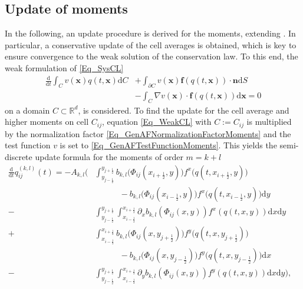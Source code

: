 \documentclass[12pt,a4paper]{article}
\begin{document}
\subsection{Update of moments}
\label{Chap_GenAF2DarbMoments}
In the following, an update procedure is derived for the moments, extending \cite{AB2023ExtensionAF, AB2023FEFV, ABK2025}. In particular, a conservative update of the cell averages is obtained, which is key to ensure convergence to the weak solution of the conservation law. 
To this end, the weak formulation of \eqref{Eq_SysCL} 
\begin{equation} \label{Eq_WeakCL}
\begin{aligned}
	\frac{\mathrm d}{\mathrm d t} \int_{C}  v(\mathbf x) q (t, \mathbf x) \mathrm{d}C &+ \int_{\partial C}v(\mathbf x) \mathbf f\left(q(t, \mathbf x)\right) \cdot \mathbf n \mathrm{d}S  \\
	&-\int_{C}  \nabla v(\mathbf x) \cdot\mathbf f\left(q(t, \mathbf x)\right) \mathrm{d} \mathbf x  = 0
\end{aligned}
\end{equation}
on a domain $C \subset \mathbb R^d$, is considered. 
To find the update for the cell average and higher moments on cell $C_{ij}$, equation \eqref{Eq_WeakCL} with $C:= C_{ij}$ is multiplied by the normalization factor \eqref{Eq_GenAFNormalizationFactorMoments} and the test function \(v\) is set to \eqref{Eq_GenAFTestFunctionMoments}.
This yields the semi-discrete update formula for the moments of order $m=k+l$
\begin{equation}\label{Eq_WeakCLCell}
\begin{aligned}
	\frac{\mathrm d}{\mathrm dt} q_{ij}^{(k,l)}(t) =- A_{k,l}
	\bigg(
	& \int_{y_{j-\frac{1}{2}}}^{y_{j+\frac{1}{2}}} b_{k,l}\big(\Phi_{ij}(x_{i+\frac{1}{2}}, y)\big) f^x\big(q(t, x_{i+\frac{1}{2}}, y)\big) \\
	& \hspace{3em}	- b_{k,l}\big(\Phi_{ij}(x_{i-\frac{1}{2}}, y)\big)f^x\big(q(t, x_{i-\frac{1}{2}}, y)\big) \mathrm d y \\
	-& \int_{y_{j-\frac{1}{2}}}^{y_{j+\frac{1}{2}}} \int_{x_{i-\frac{1}{2}}}^{x_{i+\frac{1}{2}}}  \partial_x b_{k,l}\left(\Phi_{ij}(x, y)\right) f^x\left(q(t, x,y)\right) \mathrm d x \mathrm d y \\
	+& \int_{x_{i-\frac{1}{2}}}^ {x_{i+\frac{1}{2}}} b_{k,l}\big(\Phi_{ij}(x, y_{j+\frac{1}{2}})\big) f^y\big(q(t, x, y_{j+\frac{1}{2}})\big) \\
	& \hspace{3em}	- b_{k,l}\big(\Phi_{ij}(x, y_{j-\frac{1}{2}})\big) f^y\big(q(t, x, y_{j-\frac{1}{2}})\big) \mathrm d x& \\
	-& \int_{y_{j-\frac{1}{2}}}^{y_{j+\frac{1}{2}}} \int_{x_{i-\frac{1}{2}}}^{x_{i+\frac{1}{2}}}  \partial_y b_{k,l}\left(\Phi_{ij}(x, y)\right) f^y\left(q(t, x, y)\right) \mathrm d x \mathrm d y
	 \bigg), 
\end{aligned}
\end{equation}
\end{document}
